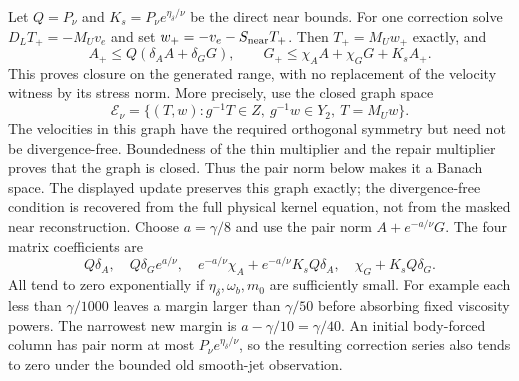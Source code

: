 Let $Q=P_\nu$ and $K_s=P_\nu e^{\eta_\delta/\nu}$
be the direct near bounds. For one correction solve
$D_LT_+=-M_Uv_e$ and set $w_+=-v_e-S_{\rm near}T_+$.
Then $T_+=M_Uw_+$ exactly, and
\[
 A_+\le Q(\delta_A A+\delta_G G),\qquad
 G_+\le\chi_A A+\chi_G G+K_s A_+.
\]
This proves closure on the generated range, with no replacement of
the velocity witness by its stress norm. More precisely, use the
closed graph space
\begin{equation}\label{repair:pair-space}
 \mathcal E_\nu=\{(T,w):g^{-1}T\in Z,\ g^{-1}w\in Y_2,
                       \ T=M_Uw\}.
\end{equation}
The velocities in this graph have the required orthogonal symmetry
but need not be divergence-free. Boundedness of the thin multiplier and
the repair multiplier proves that the graph is closed. Thus the pair
norm below makes it a Banach space. The displayed update preserves
this graph exactly; the divergence-free condition is recovered from the full
physical kernel equation, not from the masked near reconstruction.
Choose $a=\gamma/8$ and use the pair norm $A+e^{-a/\nu}G$.
The four matrix coefficients are
\[
 Q\delta_A,\quad Q\delta_Ge^{a/\nu},\quad
 e^{-a/\nu}\chi_A+e^{-a/\nu}K_sQ\delta_A,\quad
 \chi_G+K_sQ\delta_G.
\]
All tend to zero exponentially if
$\eta_\delta,\omega_b,m_0$ are sufficiently small. For example
each less than $\gamma/1000$ leaves a margin larger than
$\gamma/50$ before absorbing fixed viscosity powers. The narrowest
new margin is $a-\gamma/10=\gamma/40$. An initial body-forced
column has pair norm at most $P_\nu e^{\eta_\delta/\nu}$, so
the resulting correction series also tends to zero under the bounded
old smooth-jet observation.

